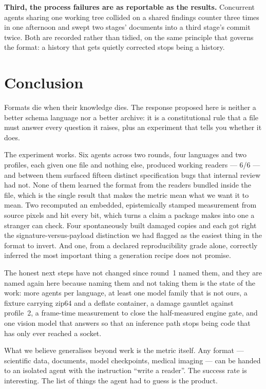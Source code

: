 \documentclass[10pt,twocolumn,letterpaper]{article}
\begin{document}
\textbf{Third, the process failures are as reportable as the results.} Concurrent
agents sharing one working tree collided on a shared findings counter three times
in one afternoon and swept two stages' documents into a third stage's commit
twice. Both are recorded rather than tidied, on the same principle that governs
the format: a history that gets quietly corrected stops being a history.

\section{Conclusion}

Formats die when their knowledge dies. The response proposed here is neither a
better schema language nor a better archive: it is a constitutional rule that a
file must answer every question it raises, plus an experiment that tells you
whether it does.

The experiment works. Six agents across two rounds, four languages and two
profiles, each given one file and nothing else, produced working readers ---
6/6 --- and between them surfaced fifteen distinct specification bugs that
internal review had not. None of them learned the format from the readers bundled
inside the file, which is the single result that makes the metric mean what we
want it to mean. Two recomputed an embedded, epistemically stamped measurement
from source pixels and hit every bit, which turns a claim a package makes into
one a stranger can check. Four spontaneously built damaged copies and each got
right the signature-versus-payload distinction we had flagged as the easiest thing
in the format to invert. And one, from a declared reproducibility grade alone,
correctly inferred the most important thing a generation recipe does not promise.

The honest next steps have not changed since round~1 named them, and they are
named again here because naming them and not taking them is the state of the work:
more agents per language, at least one model family that is not ours, a fixture
carrying zip64 and a deflate container, a damage gauntlet against profile~2, a
frame-time measurement to close the half-measured engine gate, and one vision model
that answers so that an inference path stops being code that has only ever reached
a socket.

What we believe generalises beyond werk is the metric itself. Any format ---
scientific data, documents, model checkpoints, medical imaging --- can be handed to
an isolated agent with the instruction ``write a reader''. The success rate is
interesting. The list of things the agent had to guess is the product.
\end{document}
